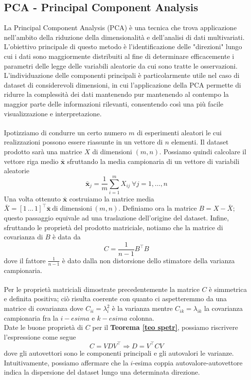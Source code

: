 \documentclass[11pt]{article}
\begin{document}
\subsection{PCA - Principal Component Analysis}
La Principal Component Analysis (PCA) è una tecnica che trova applicazione nell'ambito della riduzione della dimensionalità e dell'analisi di dati multivariati. L'obiettivo principale di questo metodo è l'identificazione delle "direzioni" lungo cui i dati sono maggiormente distribuiti al fine di determinare efficacemente i parametri delle legge delle variabili aleatorie da cui sono tratte le osservazioni. L'individuazione delle componenti principali è particolarmente utile nel caso di dataset di considerevoli dimensioni, in cui l'applicazione della PCA permette di ridurre la complessità dei dati mantenendo pur mantenendo al contempo la maggior parte delle informazioni rilevanti, consentendo così una più facile visualizzazione e interpretazione.\\
\\
Ipotizziamo di condurre un certo numero $m$ di esperimenti aleatori le cui realizzazioni possono essere riassunte in un vettore di $n$ elementi. Il dataset prodotto sarà una matrice $X$ di dimensioni $(m,n)$. Possiamo quindi calcolare il vettore riga medio $\bar{\mathbf{x}}$ sfruttando la media campionaria di un vettore di variabili aleatorie $$ \bar{\mathbf{x}}_j= \frac1m \sum_{i=1}^m X_{ij} \ \forall j=1, \dots, n$$
Una volta ottenuto $\mathbf{\bar{x}}$ costruiamo la matrice media $ \bar{X}= [1 \, \dots \, 1]^\top \bar{\mathbf{x}} \ \text{di dimensioni} \ (m,n)$.
Definiamo ora la matrice $B= X-\bar{X}$; questo passaggio equivale ad una traslazione dell'origine del dataset. Infine, sfruttando le proprietà del prodotto matriciale, notiamo che la matrice di covarianza di $B$ è data da $$ C = \frac{1}{n-1} B^\top B$$ dove il fattore $\frac{1}{n-1}$ è dato dalla non distorsione dello stimatore della varianza campionaria.\\
\\
Per le proprietà matriciali dimostrate precedentemente la matrice $C$ è simmetrica e definita positiva; ciò risulta coerente con quanto ci aspetteremmo da una matrice di covarianza dove $C_{ii} = 	\lambda_i^2$ è la varianza mentre $C_{ik} = 	\lambda_{ik}$ la covarianza campionaria fra la $i-esima$ e $k-esima$ colonna.\\
Date le buone proprietà di $C$ per il \textbf{Teorema \ref{teo spetr}}, possiamo riscrivere l'espressione come segue
\[
C = VDV^\top \Rightarrow D = V^\top CV
\]
dove gli autovettori sono le componenti principali e gli autovalori le varianze. Intuitivamente, possiamo affermare che la $i$-esima coppia autovalore-autovettore indica la dispersione del dataset lungo una determinata direzione.\\
\end{document}
